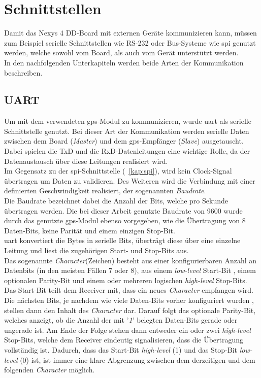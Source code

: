 \section{Schnittstellen}\label{kap:schnittstellen}

Damit das Nexys 4 DD-Board mit externen Geräte kommunizieren kann, müssen zum Beispiel serielle
Schnittstellen wie RS-232 oder Bus-Systeme wie \ac{spi}  genutzt werden, welche sowohl
vom Board, als auch vom Gerät unterstützt werden. \cite{schnittstelle}\\
In den nachfolgenden Unterkapiteln werden beide Arten der Kommunikation beschreiben. \\

\subsection{UART}\label{kap:uart}

Um mit dem verwendeten \ac{gps}-Modul zu kommunizieren, wurde \ac{uart} als serielle Schnittstelle genutzt.
Bei dieser Art der Kommunikation werden serielle Daten zwischen dem Board (\emph{Master})
und dem \ac{gps}-Empfänger (\emph{Slave}) ausgetauscht. Dabei spielen die TxD und die RxD-Datenleitungen
eine wichtige Rolle, da der Datenaustausch über diese Leitungen realisiert wird.\\
Im Gegensatz zu der \ac{spi}-Schnittstelle (~\ref{kap:spi}), wird kein Clock-Signal
übertragen um Daten zu validieren. Des Weiteren wird die Verbindung mit einer definierten
Geschwindigkeit realisiert, der sogenannten \emph{Baudrate}. \cite{uartpdf} \\
Die Baudrate bezeichnet dabei die Anzahl der Bits, welche pro Sekunde übertragen werden.
Die bei dieser Arbeit genutzte Baudrate von 9600 wurde durch das genutzte \ac{gps}-Modul
ebenso vorgegeben, wie die Übertragung von 8 Daten-Bits, keine Parität und einem einzigen Stop-Bit.\cite{pmodgps} \\
\ac{uart} konvertiert die Bytes in serielle Bits, überträgt diese über eine einzelne Leitung
und liest die zugehörigen Start- und Stop-Bits aus.\\
Das sogenannte \emph{Character}(Zeichen) besteht aus einer konfigurierbaren Anzahl an Datenbits (in den meisten
Fällen 7 oder 8), aus einem \emph{low-level} Start-Bit , einem optionalen Parity-Bit und einem
oder mehreren logischen \emph{high-level} Stop-Bits.\\
Das Start-Bit teilt dem Receiver mit, dass ein neues \emph{Character} empfangen wird.
Die nächsten Bits, je nachdem wie viele Daten-Bits vorher konfiguriert wurden , stellen
dann den Inhalt des \emph{Character} dar. Darauf folgt das optionale Parity-Bit,
welches anzeigt, ob die Anzahl der mit '\emph{1}' belegten Daten-Bits gerade oder
ungerade ist. Am Ende der Folge stehen dann entweder ein oder zwei  \emph{high-level } Stop-Bits,
welche dem Receiver eindeutig signalisieren, dass die Übertragung vollständig ist. Dadurch,
dass das Start-Bit \emph{high-level} (1) und das Stop-Bit \emph{low-level} (0) ist,
ist immer eine klare Abgrenzung zwischen dem derzeitigen und dem folgenden \emph{Character} möglich.\\


